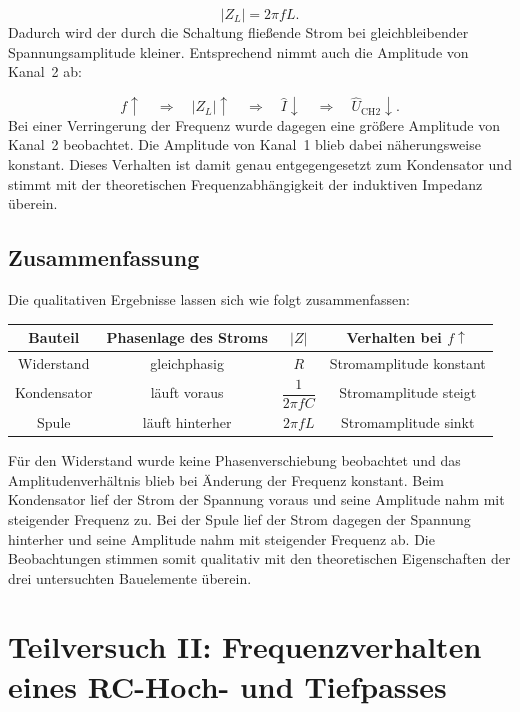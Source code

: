 \documentclass{report}
\begin{document}
\begin{equation}
|Z_L|=2\pi fL.
\end{equation}
\noindent
Dadurch wird der durch die Schaltung fließende Strom bei gleichbleibender Spannungsamplitude kleiner. Entsprechend nimmt auch die Amplitude von Kanal~2 ab:

\begin{equation}
f\uparrow
\quad\Rightarrow\quad
|Z_L|\uparrow
\quad\Rightarrow\quad
\hat I\downarrow
\quad\Rightarrow\quad
\hat U_{\mathrm{CH2}}\downarrow.
\end{equation}
\noindent
Bei einer Verringerung der Frequenz wurde dagegen eine größere Amplitude von Kanal~2 beobachtet. Die Amplitude von Kanal~1 blieb dabei näherungsweise konstant.
\noindent
Dieses Verhalten ist damit genau entgegengesetzt zum Kondensator und stimmt mit der theoretischen Frequenzabhängigkeit der induktiven Impedanz überein.

\subsection{Zusammenfassung}
\noindent
Die qualitativen Ergebnisse lassen sich wie folgt zusammenfassen:

\begin{center}
\begin{tabular}{c|c|c|c}
Bauteil & Phasenlage des Stroms & $|Z|$ & Verhalten bei $f\uparrow$\\
\hline
Widerstand
& gleichphasig
& $R$
& Stromamplitude konstant\\
Kondensator
& läuft voraus
& $\dfrac{1}{2\pi fC}$
& Stromamplitude steigt\\
Spule
& läuft hinterher
& $2\pi fL$
& Stromamplitude sinkt
\end{tabular}
\end{center}
\noindent
Für den Widerstand wurde keine Phasenverschiebung beobachtet und das Amplitudenverhältnis blieb bei Änderung der Frequenz konstant. Beim Kondensator lief der Strom der Spannung voraus und seine Amplitude nahm mit steigender Frequenz zu. Bei der Spule lief der Strom dagegen der Spannung hinterher und seine Amplitude nahm mit steigender Frequenz ab.
\noindent
Die Beobachtungen stimmen somit qualitativ mit den theoretischen Eigenschaften der drei untersuchten Bauelemente überein.

\newpage
\section{Teilversuch II: Frequenzverhalten eines RC-Hoch- und Tiefpasses}
\end{document}
